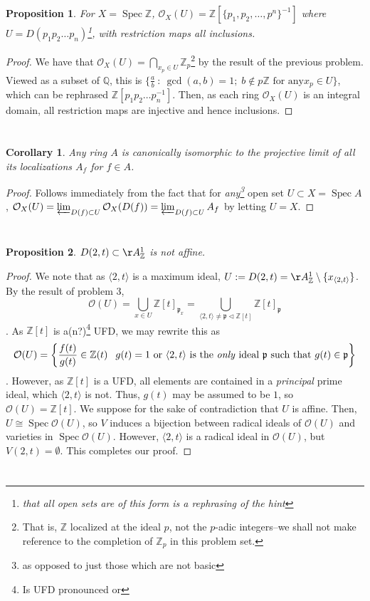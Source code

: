 \documentclass[english]{article}
\DeclareMathOperator{\spec}{Spec}
\newcommand{\ZZ}{\mathbb{Z}}
\newcommand{\QQ}{\mathbb{Q}}
\newcommand{\OO}{\mathcal{O}}
\newcommand{\pfr}{\mathfrak{p}}
\newcommand{\prob}[1]{\setcounter{section}{#1-1}\section{}}
\newtheorem*{proposition*}{Proposition}
\newtheorem*{corollary*}{Corollary}
\theoremstyle{remark}
\theoremstyle{definition}
\newcommand{\clim}{\varprojlim}
\begin{document}
\prob{1}\begin{proposition*}
	For $X=\spec \ZZ$, $\OO_X(U)=\ZZ[\{p_1,p_2,\hdots,p^n\}^{-1}]$ where $U=D(p_1p_2\hdots p_n)$\footnote{that all open sets are of this form is a rephrasing of the hint}, with restriction maps all inclusions.
\end{proposition*}
\begin{proof}
	We have that $\OO_X(U)=\bigcap_{x_p\in U} \ZZ_p$\footnote{That is, $\ZZ$ localized at the ideal $p$, not the $p$-adic integers--we shall not make reference to the completion of $\ZZ_p$ in this problem set.} by the result of the previous problem. Viewed as a subset of $\QQ$, this is $\{\frac{a}{b}\::\:\gcd(a,b)=1;\;b\notin p\ZZ\text{ for any} x_p\in U\}$, which can be rephrased $\ZZ[p_1p_2\hdots p_n^{-1}]$. Then, as each ring $\OO_X(U)$ is an integral domain, all restriction maps are injective and hence inclusions.
\end{proof}

\prob{4}\begin{corollary*}
	Any ring $A$ is canonically isomorphic to the projective limit of all its localizations $A_f$ for $f\in A$.
\end{corollary*}
\begin{proof}
	Follows immediately from the fact that for \emph{any\footnote{as opposed to just those which are not basic}} open set $U\subset X=\spec A$, $\OO_X(U)=\clim_{D(f)\subset U} \OO_X(D(f))=\clim_{D(f)\subset U}A_f$ by letting $U=X$. 
\end{proof}
\prob{5}
\begin{proposition*}
	$D(2,t)\subset \AA_\ZZ^1$ is not affine.
\end{proposition*}
\begin{proof}
We note that as $\langle 2, t\rangle $ is a maximum ideal, $U:=D(2,t)=\AA_\ZZ^1\setminus \{x_{\langle 2,t\rangle}\}$. By the result of problem 3, $$\OO(U)=\bigcup_{x\in U}\ZZ[t]_{\pfr_x}=\bigcup_{\langle 2,t\rangle \neq \pfr\triangleleft \ZZ[t]}\ZZ[t]_{\pfr}$$. As $\ZZ[t]$ is a(n?)\footnote{Is UFD pronounced  or } UFD, we may rewrite this as $$\OO(U)=\left\{\frac{f(t)}{g(t)}\in \ZZ(t)\;\:\;g(t)=1 \text{ or }\langle 2,t\rangle \text{ is the \emph{only} ideal } \pfr \text{ such that }g(t)\in \pfr\right\}$$. However, as $\ZZ[t]$ is a UFD, all elements are contained in a \emph{principal} prime ideal, which $\langle 2,t\rangle $ is not. Thus, $g(t)$ may be assumed to be $1$, so $\OO(U)=\ZZ[t]$. We suppose for the sake of contradiction that $U$ is affine. Then, $U\cong \spec\OO(U)$, so $V$ induces a bijection between radical ideals of $\OO(U)$ and varieties in $\spec \OO(U)$. However, $\langle 2,t\rangle  $ is a radical ideal in $\OO(U)$, but $V(2,t)=\emptyset$. This completes our proof.
	\end{proof}
\prob{6}
\end{document}
